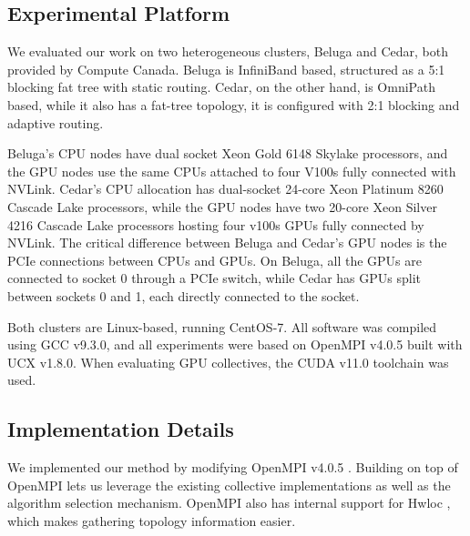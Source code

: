 \subsection{Experimental Platform}\label{sec:CH4-experimental-platform}
We evaluated our work on two heterogeneous clusters, Beluga and Cedar, both provided by Compute Canada. 
Beluga is InfiniBand based, structured as a 5:1 blocking fat tree with static routing.  
Cedar, on the other hand, is OmniPath based, while it also has a fat-tree topology, it is configured with 2:1 blocking and adaptive routing.

Beluga's \gls{CPU} nodes have dual socket Xeon Gold 6148 Skylake processors, and the \gls{GPU} nodes use the same \gls{CPU}s attached to four V100s fully connected with NVLink.
Cedar's \gls{CPU} allocation has dual-socket 24-core Xeon Platinum 8260 Cascade Lake processors, while the \gls{GPU} nodes have two 20-core Xeon Silver 4216 Cascade Lake processors hosting four v100s \gls{GPU}s fully connected by NVLink.
The critical difference between Beluga and Cedar's \gls{GPU} nodes is the \gls{PCIe} connections between \gls{CPU}s and \gls{GPU}s.
On Beluga, all the \gls{GPU}s are connected to socket 0 through a \gls{PCIe} switch, while Cedar has \gls{GPU}s split between sockets 0 and 1, each directly connected to the socket.

Both clusters are Linux-based, running CentOS-7. 
All software was compiled using GCC v9.3.0, and all experiments were based on OpenMPI v4.0.5 built with \gls{UCX} v1.8.0.
When evaluating \gls{GPU} collectives, the \gls{CUDA} v11.0 toolchain was used.

\subsection{Implementation Details}\label{sec:CH4-impl-details}
We implemented our method by modifying OpenMPI v4.0.5 \cite{gabriel2004OpenMPI}.
Building on top of OpenMPI lets us leverage the existing collective implementations as well as the algorithm selection mechanism.
OpenMPI also has internal support for Hwloc \cite{Broquedis2010hwloc}, which makes gathering topology information easier.


